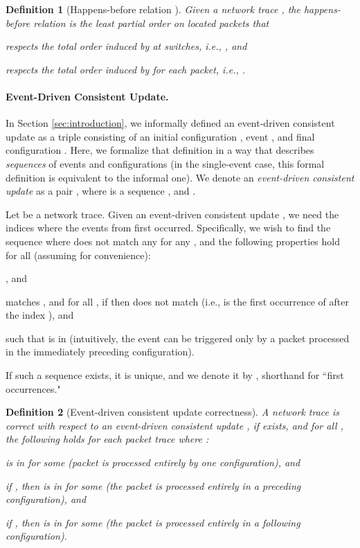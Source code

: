 \documentclass[pldi-cameraready]{sigplanconf}
\newtheorem{definition}{Definition}
\begin{document}
\begin{definition}[Happens-before relation ]
Given a network trace , the
happens-before relation  is the least partial order on
located packets that
\begin{compactitem}
\item respects the total order induced by  at switches, i.e.,
  , and
\item respects the total order induced by  for each packet,
  i.e., .
\end{compactitem}
\end{definition}

\paragraph*{Event-Driven Consistent Update.}
In Section \ref{sec:introduction}, we informally defined an
event-driven consistent update
as a triple  consisting of an initial configuration ,
event , and final configuration . 
Here, we formalize that definition in a way that describes
{\em sequences} of events and configurations (in the single-event case,
this formal definition is equivalent to the informal one).
We denote an {\em event-driven consistent update} as a pair , where
 is a sequence
,
and .


Let  be a network trace.   Given an event-driven consistent update 
, 
we need the indices where the events from  first
occurred. Specifically, we wish to find the 
sequence  where  does not match any 
for any , and the
following properties hold for all  (assuming  for
convenience): 
\begin{compactitem}
\item , and
\item  matches , and for all , 
           if  then  does not match 
           (i.e.,  is the first occurrence of  after the
           index ), and
\item  such that  is
in  (intuitively, the event  can be triggered only  by
a packet processed in the immediately preceding configuration). 
\end{compactitem}
If such a sequence exists, it is unique, and we denote it by , shorthand for ``first occurrences."

\begin{definition}[Event-driven consistent update correctness]
A network trace  is {\em correct} with respect to an event-driven consistent
update ,
if  exists, and for all ,
the following holds for each packet trace  where : 
\begin{compactitem}
\item
   is in  for some 
  (packet is processed entirely by one configuration), and
\item if , then 
   is in  for some 
  (the packet is processed entirely in a preceding configuration), and 
\item if , then  is in  for some 
  (the packet is
  processed entirely in a following configuration).
\end{compactitem}
\end{definition}
\end{document}
